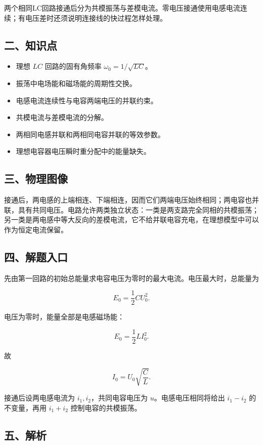 \documentclass[12pt,a4paper,UTF8]{ctexart}
\newcommand{\tightlist}{\setlength{\itemsep}{0pt}\setlength{\parskip}{0pt}}
\begin{document}
两个相同LC回路接通后分为共模振荡与差模电流。零电压接通使用电感电流连续；有电压差时还须说明连接线的快过程怎样处理。

\subsection{二、知识点}\label{ux4e8cux77e5ux8bc6ux70b9-3}

\begin{itemize}
\tightlist
\item
  理想 \(LC\) 回路的固有角频率 \(\omega_0=1/\sqrt{LC}\)。
\item
  振荡中电场能和磁场能的周期性交换。
\item
  电感电流连续性与电容两端电压的并联约束。
\item
  共模电流与差模电流的分解。
\item
  两相同电感并联和两相同电容并联的等效参数。
\item
  理想电容器电压瞬时重分配中的能量缺失。
\end{itemize}

\subsection{三、物理图像}\label{ux4e09ux7269ux7406ux56feux50cf-3}

接通后，两电感的上端相连、下端相连，因而它们两端电压始终相同；两电容也并联，具有共同电压。电路允许两类独立状态：一类是两支路完全同相的共模振荡；另一类是两电感中等大反向的差模电流，它不给并联电容充电，在理想模型中可以作为恒定电流保留。

\subsection{四、解题入口}\label{ux56dbux89e3ux9898ux5165ux53e3-3}

先由第一回路的初始总能量求电容电压为零时的最大电流。电压最大时，总能量为

\[E_0=\frac12CU_0^2.\]

电压为零时，能量全部是电感磁场能：

\[E_0=\frac12LI_0^2.\]

故

\[I_0=U_0\sqrt{\frac CL}.\]

接通后设两电感电流为 \(i_1,i_2\)，共同电容电压为
\(u\)。电感电压相同将给出 \(i_1-i_2\) 的不变量，再用 \(i_1+i_2\)
控制电容的共模振荡。

\subsection{五、解析}\label{ux4e94ux89e3ux6790-3}
\end{document}
